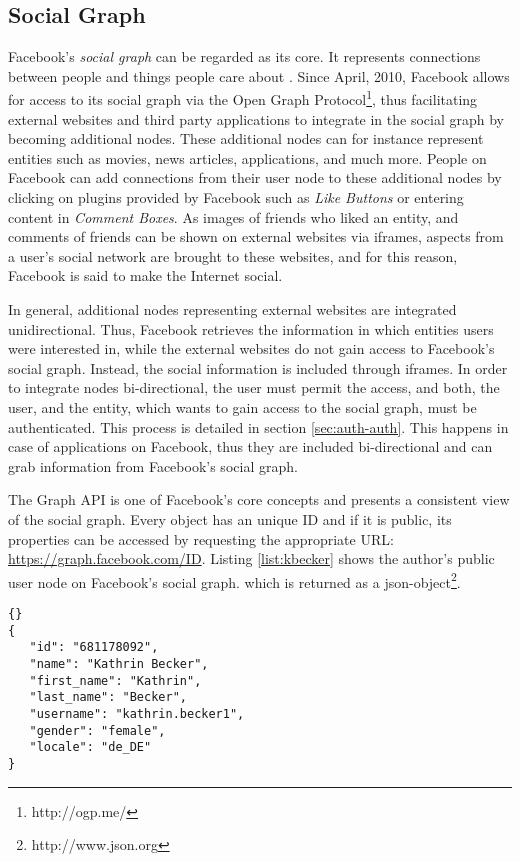 \documentclass[preprint,12pt]{elsarticle}
\begin{document}
\subsection{Social Graph}
\label{sec:social-graph}
Facebook's \textit{social graph} can be regarded as its core. It
represents connections between people and things people care about 
\cite{facebookDev}. Since April, 2010, Facebook allows for access to its
social graph via the Open Graph Protocol\footnote{http://ogp.me/}, thus facilitating
external websites and third party applications to integrate in the social graph by becoming
additional nodes\cite{facebookDev2}. These additional nodes can for
instance represent entities such as movies, news articles,
applications, and much more. People on Facebook can add connections
from their user node to these additional nodes by clicking on plugins
provided by Facebook such as \textit{Like Buttons} or entering content in \textit{Comment
  Boxes}.  \cite{facebookDev2} As images of friends who liked an
entity, and comments of friends can be shown on external websites via
iframes, aspects from a user's social network are brought to these
websites, and for this reason, Facebook is said to make the Internet social.

In general, additional nodes representing external websites are integrated
unidirectional. Thus, Facebook retrieves the information in which
entities users were interested in, while the external websites do not
gain access to Facebook's social graph. Instead, the social
information is included through iframes.
In order to integrate nodes bi-directional, the user must permit the
access, and both, the user, and the entity, which wants to gain access
to the social graph, must be authenticated. This process is detailed in
section \ref{sec:auth-auth}. This happens in case of applications on
Facebook, thus they are included bi-directional and can grab
information from Facebook's social graph.

The Graph API is one of Facebook's core concepts and presents a consistent
view of the social graph. Every object has an unique ID and if it is
public, its properties can be accessed by requesting the appropriate URL:
\url{https://graph.facebook.com/ID}. Listing \ref{list:kbecker} shows
the author's public user node on Facebook's social graph. which is
returned as a \ac{json}-object\footnote{http://www.json.org}.

\begin{lstlisting}[caption=JSON object from
  \url{https://graph.facebook.com/681178092},
  label=list:kbecker]{}
{
   "id": "681178092",
   "name": "Kathrin Becker",
   "first_name": "Kathrin",
   "last_name": "Becker",
   "username": "kathrin.becker1",
   "gender": "female",
   "locale": "de_DE"
}
\end{lstlisting}
\end{document}
